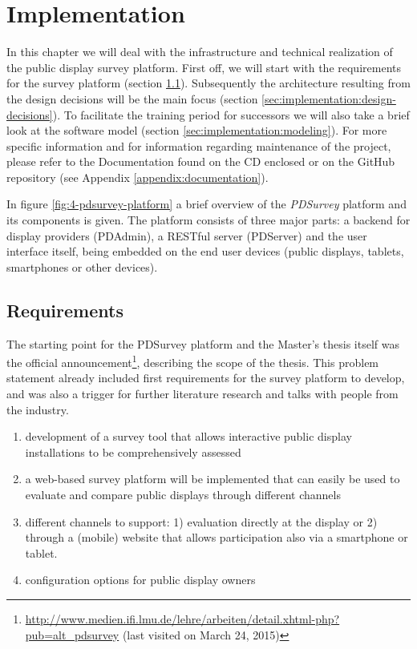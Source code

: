 \section{Implementation}
\label{sec:implementation}

	In this chapter we will deal with the infrastructure and technical realization of the public display survey platform. First off, we will start with the requirements for the survey platform (section \ref{sec:implementation:requirements}). Subsequently the architecture resulting from the design decisions will be the main focus (section \ref{sec:implementation:design-decisions}). To facilitate the training period for successors we will also take a brief look at the software model (section \ref{sec:implementation:modeling}). For more specific information and for information regarding maintenance of the project, please refer to the Documentation found on the CD enclosed or on the GitHub repository (see Appendix \ref{appendix:documentation}).

	In figure \ref{fig:4-pdsurvey-platform} a brief overview of the \textit{PDSurvey} platform and its components is given. The platform consists of three major parts: a backend for display providers (PDAdmin), a RESTful server (PDServer) and the user interface itself, being embedded on the end user devices (public displays, tablets, smartphones or other devices). 






\subsection{Requirements}
\label{sec:implementation:requirements}

	The starting point for the PDSurvey platform and the Master's thesis itself was the official announcement\footnote{\url{http://www.medien.ifi.lmu.de/lehre/arbeiten/detail.xhtml-php?pub=alt_pdsurvey} (last visited on March 24, 2015)}, describing the scope of the thesis. This problem statement already included first requirements for the survey platform to develop, and was also a trigger for further literature research and talks with people from the industry.

	\begin{enumerate}[itemsep=0pt] 
	\item development of a survey tool that allows interactive public display installations to be comprehensively assessed 
	\item a web-based survey platform will be implemented that can easily be used to evaluate and compare public displays through different channels 
	\item different channels to support: 1) evaluation directly at
	the display or 2) through a (mobile) website that allows participation also via a smartphone
	or tablet.
	\item configuration options for public display owners
	\end{enumerate}

